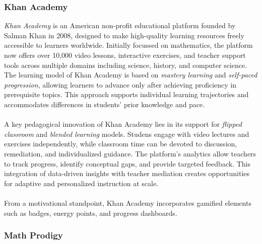 \subsubsection{Khan Academy}
\textit{Khan Academy} is an American non-profit educational platform founded by Salman Khan in 2008, designed to make high-quality learning resources freely accessible to learners worldwide. Initially focussed on mathematics, the platform now offers over 10,000 video lessons, interactive exercises, and teacher support tools across multiple domains including science, history, and computer science. The learning model of Khan Academy is based on \textit{mastery learning} and \textit{self-paced progression}, allowing learners to advance only after achieving proficiency in prerequisite topics. This approach supports individual learning trajectories and accommodates differences in students' prior knowledge and pace.\\ \\
A key pedagogical innovation of Khan Academy lies in its support for \textit{flipped classroom} and \textit{blended learning} models. Studens engage with video lectures and exercises independently, while classroom time can be devoted to discussion, remediation, and individualized guidance. The platform’s analytics allow teachers to track progress, identify conceptual gaps, and provide targeted feedback. This integration of data-driven insights with teacher mediation creates opportunities for adaptive and personalized instruction at scale.\\ \\
From a motivational standpoint, Khan Academy incorporates gamified elements such as badges, energy points, and progress dashboards.
\subsubsection{Math Prodigy}


